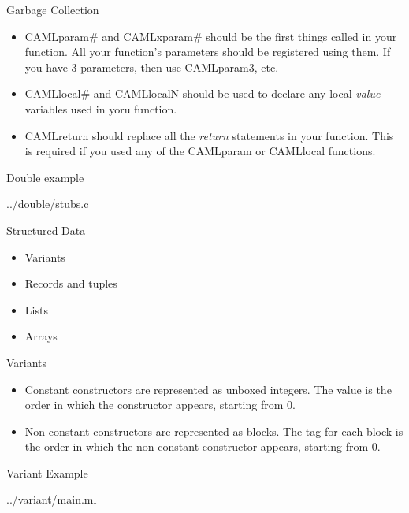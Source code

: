 \documentclass{beamer}
\begin{document}
\begin{frame}{Garbage Collection}
\begin{itemize}
    \item CAMLparam\# and CAMLxparam\# should be the first things called in your function.  All your function's
    parameters should be registered using them.  If you have 3 parameters, then use CAMLparam3, etc.
    \item CAMLlocal\# and CAMLlocalN should be used to declare any local \emph{value} variables used in yoru function.
    \item CAMLreturn should replace all the \emph{return} statements in your function.  This is required if you used
    any of the CAMLparam or CAMLlocal functions.
\end{itemize}
\end{frame}

\begin{frame}[fragile]{Double example}
\begin{lstinputlisting}[language=C]{../double/stubs.c}
\end{lstinputlisting}
\end{frame}

\begin{frame}{Structured Data}
\begin{itemize}
    \item Variants
    \item Records and tuples
    \item Lists
    \item Arrays
\end{itemize}
\end{frame}

\begin{frame}{Variants}
\begin{itemize}
    \item Constant constructors are represented as unboxed integers.  The value is the order in which the constructor
    appears, starting from 0.
    \item Non-constant constructors are represented as blocks.  The tag for each block is the order in which the
    non-constant constructor appears, starting from 0.
\end{itemize}
\end{frame}

\begin{frame}[fragile,shrink=10]{Variant Example}
\begin{lstinputlisting}[language=ML]{../variant/main.ml}
\end{lstinputlisting}
\end{frame}
\end{document}
